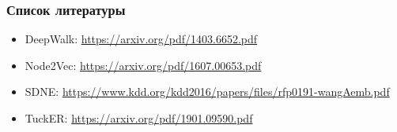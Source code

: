\documentclass{beamer}
\begin{document}
\begin{frame}
\frametitle{Список литературы}
\begin{itemize}
    \item DeepWalk: \url{https://arxiv.org/pdf/1403.6652.pdf}
    \item Node2Vec: \url{https://arxiv.org/pdf/1607.00653.pdf}
    \item SDNE: \url{https://www.kdd.org/kdd2016/papers/files/rfp0191-wangAemb.pdf}
    \item TuckER: \url{https://arxiv.org/pdf/1901.09590.pdf}
\end{itemize}
\end{frame}
\end{document}
